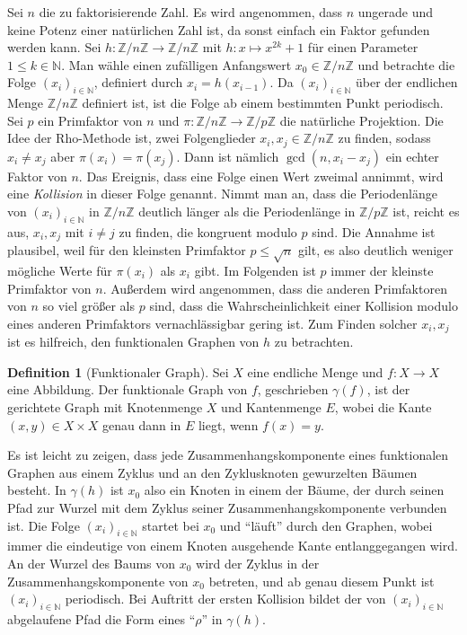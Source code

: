 \documentclass[a4paper, 11pt, ngerman]{article}
\newcommand{\N}{\mathbb{N}}
\newcommand{\Z}{\mathbb{Z}}
\theoremstyle{definition}
\newtheorem{definition}{Definition}
\theoremstyle{plain}
\theoremstyle{remark}
\begin{document}
Sei $n$ die zu faktorisierende Zahl. Es wird angenommen, dass $n$ ungerade und keine Potenz einer natürlichen Zahl ist, da sonst einfach ein Faktor gefunden werden kann. Sei $h : \Z/n\Z \to \Z/n\Z$ mit $h : x \mapsto x^{2k} + 1$ für einen Parameter $1 \le k \in \N$. Man wähle einen zufälligen Anfangswert $x_0 \in \Z/n\Z$ und betrachte die Folge $(x_i)_{i \in \N}$, definiert durch $x_i = h(x_{i - 1})$. Da $(x_i)_{i \in \N}$ über der endlichen Menge $\Z/n\Z$ definiert ist, ist die Folge ab einem bestimmten Punkt periodisch. Sei $p$ ein Primfaktor von $n$ und $\pi : \Z/n\Z \to \Z/p\Z$ die natürliche Projektion. Die Idee der Rho-Methode ist, zwei Folgenglieder $x_i, x_j \in \Z/n\Z$ zu finden, sodass $x_i \ne x_j$ aber $\pi(x_i) = \pi(x_j)$. Dann ist nämlich $\gcd(n, x_i - x_j)$ ein echter Faktor von $n$. Das Ereignis, dass eine Folge einen Wert zweimal annimmt, wird eine \emph{Kollision} in dieser Folge genannt. Nimmt man an, dass die Periodenlänge von $(x_i)_{i \in \N}$ in $\Z/n\Z$ deutlich länger als die Periodenlänge in $\Z/p\Z$ ist, reicht es aus, $x_i, x_j$ mit $i \ne j$ zu finden, die kongruent modulo $p$ sind. Die Annahme ist plausibel, weil für den kleinsten Primfaktor $p \le \sqrt n$ gilt, es also deutlich weniger mögliche Werte für $\pi(x_i)$ als $x_i$ gibt. Im Folgenden ist $p$ immer der kleinste Primfaktor von $n$. Außerdem wird angenommen, dass die anderen Primfaktoren von $n$ so viel größer als $p$ sind, dass die Wahrscheinlichkeit einer Kollision modulo eines anderen Primfaktors vernachlässigbar gering ist. Zum Finden solcher $x_i, x_j$ ist es hilfreich, den funktionalen Graphen von $h$ zu betrachten.

\begin{definition}[Funktionaler Graph]
    Sei $X$ eine endliche Menge und $f: X \to X$ eine Abbildung. Der funktionale Graph von $f$, geschrieben $\gamma(f)$, ist der gerichtete Graph mit Knotenmenge $X$ und Kantenmenge $E$, wobei die Kante $(x, y) \in X \times X$ genau dann in $E$ liegt, wenn $f(x) = y$.
\end{definition}

\noindent Es ist leicht zu zeigen, dass jede Zusammenhangskomponente eines funktionalen Graphen aus einem Zyklus und an den Zyklusknoten gewurzelten Bäumen besteht. In $\gamma(h)$ ist $x_0$ also ein Knoten in einem der Bäume, der durch seinen Pfad zur Wurzel mit dem Zyklus seiner Zusammenhangskomponente verbunden ist. Die Folge $(x_i)_{i \in \N}$ startet bei $x_0$ und "`läuft"' durch den Graphen, wobei immer die eindeutige von einem Knoten ausgehende Kante entlanggegangen wird. An der Wurzel des Baums von $x_0$ wird der Zyklus in der Zusammenhangskomponente von $x_0$ betreten, und ab genau diesem Punkt ist $(x_i)_{i \in \N}$ periodisch. Bei Auftritt der ersten Kollision bildet der von $(x_i)_{i \in \N}$ abgelaufene Pfad die Form eines "`$\rho$"' in $\gamma(h)$.
\end{document}
